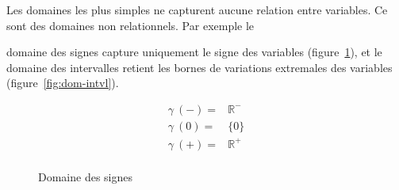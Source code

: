 Les domaines les plus simples ne capturent aucune relation entre variables. Ce
sont des domaines non relationnels. Par exemple le

domaine des signes capture uniquement le signe des variables
(figure~\ref{fig:dom-sig}), et le domaine des intervalles retient les bornes de
variations extremales des variables (figure~\ref{fig:dom-intvl}).

\begin{figure}%
\centering

\begin{minipage}{0.4\textwidth}
\end{minipage}
\begin{minipage}{0.4\textwidth}
  \begin{align*}
  γ~(-) = & ℝ^- \\
  γ~(0) = & \{0\} \\
  γ~(+) = & ℝ^+ \\
  \end{align*}
\end{minipage}

\caption{Domaine des signes}
\label{fig:dom-sig}
\end{figure}%

